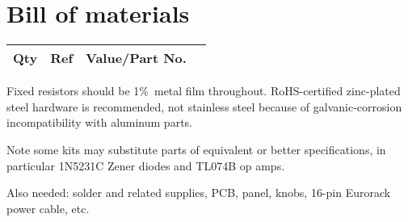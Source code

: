
%
%
%
%
%
%

\onecolumn
\chapter{Bill of materials}\label{cha:bom}

{\centering
{}

\begin{longtable}{rp{1.4in}cp{2.9in}}
  \textbf{Qty} & \textbf{Ref} & \textbf{Value/Part No.} & \\ \hline \endhead

\end{longtable}\par}

Fixed resistors should be 1\%\ metal film throughout.
RoHS-certified zinc-plated steel hardware is recommended, not stainless
steel because of galvanic-corrosion incompatibility with aluminum parts.

Note some kits may substitute parts of equivalent or better specifications,
in particular 1N5231C Zener diodes and TL074B op amps.

Also needed:  solder and related supplies, PCB, panel, knobs,
16-pin Eurorack power cable, etc.

\twocolumn

